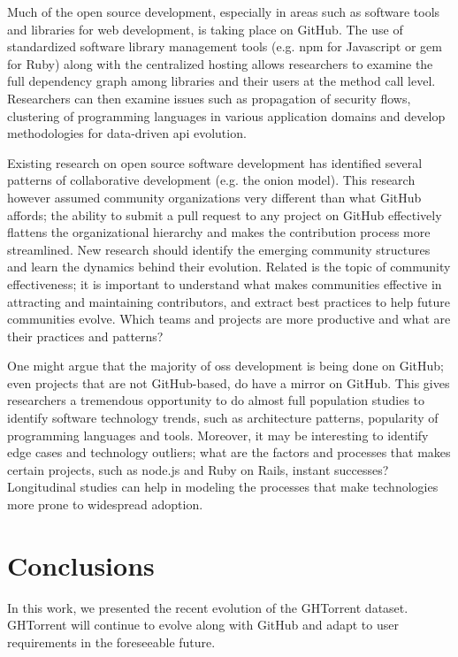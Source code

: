 \documentclass{sig-alternate}
\begin{document}
 Much of the open source development,
especially in areas such as software tools and libraries for web development, is
taking place on GitHub. The use of standardized software library management
tools (e.g. \textsf{npm} for Javascript or \textsf{gem} for Ruby) along with the
centralized hosting allows researchers to examine the full dependency graph
among libraries and their users at the method call level. Researchers can then
examine issues such as propagation of security flows, clustering of programming
languages in various application domains and develop methodologies for
data-driven {\sc api} evolution.

 Existing research on open source
software development has identified several patterns of collaborative
development (e.g. the onion model). This research however assumed community
organizations very different than what GitHub affords; the ability to submit a
pull request to any project on GitHub effectively flattens the organizational
hierarchy and makes the contribution process more streamlined. New research
should identify the emerging community structures and learn the dynamics
behind their evolution. Related is the topic of community effectiveness; it is
important to understand what makes communities effective in attracting and
maintaining contributors, and extract best practices to help future communities
evolve. Which teams and projects are more productive and what are their practices
and patterns?

 One might argue that the majority of
{\sc oss} development is being done on GitHub; even projects that are not
GitHub-based, do have a mirror on GitHub. This gives researchers a tremendous
opportunity to do almost full population studies to identify software technology
trends, such as architecture patterns, popularity of programming languages and
tools. Moreover, it may be interesting to identify edge cases and technology
outliers; what are the factors and processes that makes certain projects, such
as \textsf{node.js} and Ruby on Rails, instant successes? Longitudinal studies
can help in modeling the processes that make technologies more prone to
widespread adoption.

\section{Conclusions}

In this work, we presented the recent evolution of the GHTorrent dataset.
GHTorrent will continue to evolve along with GitHub and adapt to user
requirements in the foreseeable future.
\end{document}
